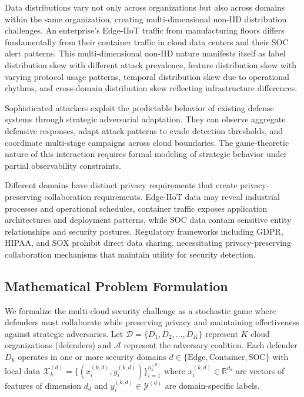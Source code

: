 \documentclass[12pt,a4paper]{article}
\theoremstyle{definition}
\begin{document}
Data distributions vary not only across organizations but also across domains within the same organization, creating multi-dimensional non-IID distribution challenges. An enterprise's Edge-IIoT traffic from manufacturing floors differs fundamentally from their container traffic in cloud data centers and their SOC alert patterns. This multi-dimensional non-IID nature manifests itself as label distribution skew with different attack prevalence, feature distribution skew with varying protocol usage patterns, temporal distribution skew due to operational rhythms, and cross-domain distribution skew reflecting infrastructure differences.

Sophisticated attackers exploit the predictable behavior of existing defense systems through strategic adversarial adaptation. They can observe aggregate defensive responses, adapt attack patterns to evade detection thresholds, and coordinate multi-stage campaigns across cloud boundaries. The game-theoretic nature of this interaction requires formal modeling of strategic behavior under partial observability constraints.

Different domains have distinct privacy requirements that create privacy-preserving collaboration requirements. Edge-IIoT data may reveal industrial processes and operational schedules, container traffic exposes application architectures and deployment patterns, while SOC data contain sensitive entity relationships and security postures. Regulatory frameworks including GDPR, HIPAA, and SOX prohibit direct data sharing, necessitating privacy-preserving collaboration mechanisms that maintain utility for security detection.

\subsection{Mathematical Problem Formulation}

We formalize the multi-cloud security challenge as a stochastic game where defenders must collaborate while preserving privacy and maintaining effectiveness against strategic adversaries. Let $\mathcal{D} = \{D_1, D_2, \ldots, D_K\}$ represent $K$ cloud organizations (defenders) and $\mathcal{A}$ represent the adversary coalition. Each defender $D_k$ operates in one or more security domains $d \in \{\text{Edge}, \text{Container}, \text{SOC}\}$ with local data $\mathcal{X}_k^{(d)} = \{(x_i^{(k,d)}, y_i^{(k,d)})\}_{i=1}^{n_k^{(d)}}$ where $x_i^{(k,d)} \in \mathbb{R}^{d_d}$ are vectors of features of dimension $d_d$ and $y_i^{(k,d)} \in \mathcal{Y}^{(d)}$ are domain-specific labels.
\end{document}
